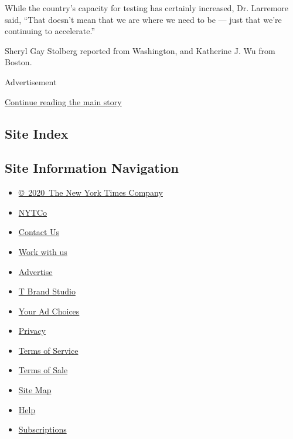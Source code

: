 While the country's capacity for testing has certainly increased, Dr.
Larremore said, ``That doesn't mean that we are where we need to be ---
just that we're continuing to accelerate.''

Sheryl Gay Stolberg reported from Washington, and Katherine J. Wu from
Boston.

Advertisement

\protect\hyperlink{after-bottom}{Continue reading the main story}

\hypertarget{site-index}{%
\subsection{Site Index}\label{site-index}}

\hypertarget{site-information-navigation}{%
\subsection{Site Information
Navigation}\label{site-information-navigation}}

\begin{itemize}
\tightlist
\item
  \href{https://help.nytimes.com/hc/en-us/articles/115014792127-Copyright-notice}{©~2020~The
  New York Times Company}
\end{itemize}

\begin{itemize}
\tightlist
\item
  \href{https://www.nytco.com/}{NYTCo}
\item
  \href{https://help.nytimes.com/hc/en-us/articles/115015385887-Contact-Us}{Contact
  Us}
\item
  \href{https://www.nytco.com/careers/}{Work with us}
\item
  \href{https://nytmediakit.com/}{Advertise}
\item
  \href{http://www.tbrandstudio.com/}{T Brand Studio}
\item
  \href{https://www.nytimes.com/privacy/cookie-policy\#how-do-i-manage-trackers}{Your
  Ad Choices}
\item
  \href{https://www.nytimes.com/privacy}{Privacy}
\item
  \href{https://help.nytimes.com/hc/en-us/articles/115014893428-Terms-of-service}{Terms
  of Service}
\item
  \href{https://help.nytimes.com/hc/en-us/articles/115014893968-Terms-of-sale}{Terms
  of Sale}
\item
  \href{https://spiderbites.nytimes.com}{Site Map}
\item
  \href{https://help.nytimes.com/hc/en-us}{Help}
\item
  \href{https://www.nytimes.com/subscription?campaignId=37WXW}{Subscriptions}
\end{itemize}
